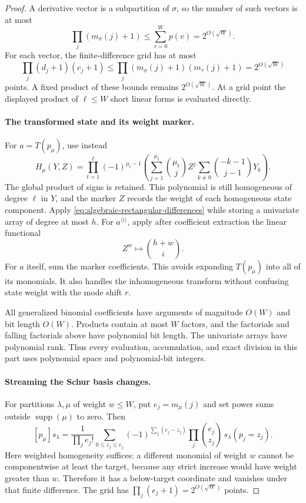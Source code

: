 \begin{proof}
A derivative vector is a subpartition of $\sigma$, so the number
of such vectors is at most
\[
 \prod_j(m_\sigma(j)+1)\le\sum_{v=0}^W p(v)
 =2^{O(\sqrt W)}.
\]
For each vector, the finite-difference grid has at most
\[
 \prod_j(d_j+1)(c_j+1)
 \le\prod_j(m_\sigma(j)+1)(m_\tau(j)+1)
 =2^{O(\sqrt W)}
\]
points.  A fixed product of these bounds remains
$2^{O(\sqrt W)}$.  At a grid point the displayed product of
$\ell\le W$ short linear forms is evaluated directly.

\paragraph{The transformed state and its weight marker.}
For $a=T(p_\mu)$, use instead
\[
 H_\mu(Y,Z)=
 \prod_{t=1}^{\ell}(-1)^{\mu_t-1}
 \left(\sum_{j=1}^{\mu_t}\binom{\mu_t}{j}Z^j
       \sum_{k\ne0}\binom{-k-1}{j-1}Y_k\right).
\]
The global product of signs is retained.  This polynomial is still
homogeneous of degree $\ell$ in $Y$, and the marker $Z$ records
the weight of each homogeneous state component.  Apply
\eqref{eq:algebraic-rectangular-differences} while storing a
univariate array of degree at most $h$.  For
$a^{\langle i\rangle}$, apply after coefficient extraction the
linear functional
\[
 Z^w\longmapsto\binom{h+w}{i}.
\]
For $a$ itself, sum the marker coefficients.  This avoids expanding
$T(p_\mu)$ into all of its monomials.  It also handles the
inhomogeneous transform without confusing state weight with the
mode shift $r$.

All generalized binomial coefficients have arguments of magnitude
$O(W)$ and bit length $O(W)$.  Products contain at most $W$
factors, and the factorials and falling factorials above have
polynomial bit length.  The univariate arrays have polynomial
rank.  Thus every evaluation, accumulation, and exact division in
this part uses polynomial space and polynomial-bit integers.

\paragraph{Streaming the Schur basis changes.}
For partitions $\lambda,\mu$ of weight $w\le W$, put
$e_j=m_\mu(j)$ and set power sums outside
$\operatorname{supp}(\mu)$ to zero.  Then
\[
 [p_\mu]s_\lambda
 =\frac1{\prod_j e_j!}
   \sum_{0\le z_j\le e_j}
   (-1)^{\sum_j(e_j-z_j)}
   \prod_j\binom{e_j}{z_j}\,s_\lambda(p_j=z_j).
\]
Here weighted homogeneity suffices: a different monomial of
weight $w$ cannot be componentwise at least the target, because
any strict increase would have weight greater than $w$.
Therefore it has a below-target coordinate and vanishes under
that finite difference.  The grid has
$\prod_j(e_j+1)=2^{O(\sqrt W)}$ points.


\end{proof}
